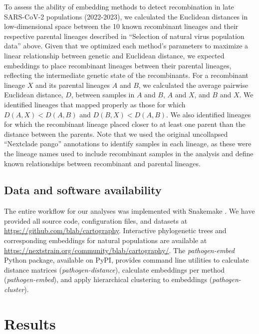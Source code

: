 \documentclass[10pt,letterpaper]{article}
\begin{document}
To assess the ability of embedding methods to detect recombination in late SARS-CoV-2 populations (2022-2023), we calculated the Euclidean distances in low-dimensional space between the 10 known recombinant lineages and their respective parental lineages described in ``Selection of natural virus population data'' above.
Given that we optimized each method's parameters to maximize a linear relationship between genetic and Euclidean distance, we expected embeddings to place recombinant lineages between their parental lineages, reflecting the intermediate genetic state of the recombinants.
For a recombinant lineage $X$ and its parental lineages $A$ and $B$, we calculated the average pairwise Euclidean distance, $D$, between samples in $A$ and $B$, $A$ and $X$, and $B$ and $X$.
We identified lineages that mapped properly as those for which $D(A, X) < D(A, B)$ and $D(B, X) < D(A, B)$.
We also identified lineages for which the recombinant lineage placed closer to at least one parent than the distance between the parents.
Note that we used the original uncollapsed ``Nextclade pango'' annotations to identify samples in each lineage, as these were the lineage names used to include recombinant samples in the analysis and define known relationships between recombinant and parental lineages.

\subsection*{Data and software availability}

The entire workflow for our analyses was implemented with Snakemake \cite{molder_2021}.
We have provided all source code, configuration files, and datasets at \href{https://github.com/blab/cartography}{https://github.com/blab/cartography}.
Interactive phylogenetic trees and corresponding embeddings for natural populations are available at \href{https://nextstrain.org/community/blab/cartography/}{https://nextstrain.org/community/blab/cartography/}.
The \textit{pathogen-embed} Python package, available on PyPI, provides command line utilities to calculate distance matrices (\textit{pathogen-distance}), calculate embeddings per method (\textit{pathogen-embed}), and apply hierarchical clustering to embeddings (\textit{pathogen-cluster}).

\section*{Results}
\end{document}
